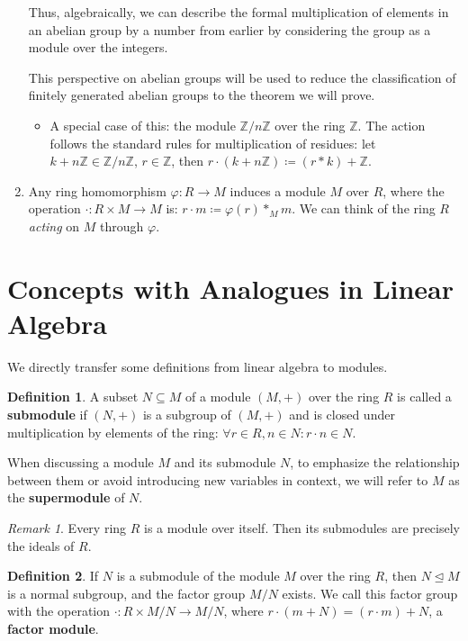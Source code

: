 \documentclass{article}
\newif\ifusemulticols
\newcommand\newterm[1]{\textbf{#1}}
\theoremstyle{definition}
\newtheorem{deff}{Definition}
\theoremstyle{remark}
\newtheorem*{note}{Remark}
\theoremstyle{plain}
\theoremstyle{plain}
\newenvironment{mymulticols}
    { \ifusemulticols \begin{multicols}{2} \fi }
    { \ifusemulticols \end{multicols} \fi }
\newcommand{\Z}{\mathbb{Z}}
\begin{document}
\begin{mymulticols}
\begin{enumerate}
        Thus, algebraically, we can describe the formal multiplication of elements in an abelian
        group by a number from earlier by considering the group as a module over the integers.

        This perspective on abelian groups will be used to reduce the classification of finitely
        generated abelian groups to the theorem we will prove.
        \begin{itemize}
            \item A special case of this: the module $\Z/n\Z$ over the ring $\Z$. The action follows
              the standard rules for multiplication of residues: let $k+n\Z \in \Z/n\Z$, $r \in \Z$,
              then $r \cdot (k + n\Z) \coloneqq (r*k) + \Z$.
        \end{itemize}

    \item Any ring homomorphism ${\varphi: R \to M}$ induces a module $M$ over $R$, where the
      operation ${\cdot: R \times M \to M}$ is: $r \cdot m \coloneqq \varphi(r) *_M m$. We can think
      of the ring $R$ \emph{acting} on $M$ through $\varphi$.
\end{enumerate}

\section{Concepts with Analogues in Linear Algebra}
We directly transfer some definitions from linear algebra to modules.

\begin{deff}
    A subset $N \subseteq M$ of a module $(M, +)$ over the ring $R$ is called a \newterm{submodule} if $(N, +)$ is a subgroup of $(M, +)$ and is closed under multiplication by elements of the ring: $\forall r \in R, n \in N: r\cdot n \in N$.

    When discussing a module $M$ and its submodule $N$, to emphasize the relationship between them or avoid introducing new variables in context, we will refer to $M$ as the \newterm{supermodule} of $N$.
\end{deff}

\begin{note}
    Every ring $R$ is a module over itself. Then its submodules are precisely the ideals of $R$.
\end{note}

\begin{deff}
    If $N$ is a submodule of the module $M$ over the ring $R$, then $N \trianglelefteq M$ is a normal subgroup, and the factor group $M/N$ exists. We call this factor group with the operation $\cdot:R \times M/N \to M/N$, where $r \cdot (m + N) = (r \cdot m) + N$, a \newterm{factor module}.
\end{deff}


\end{mymulticols}
\end{document}
